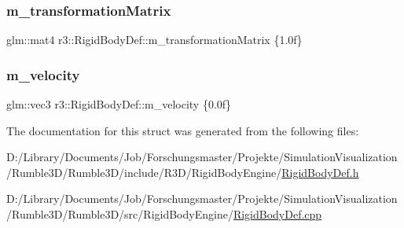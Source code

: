 \mbox{\label{structr3_1_1_rigid_body_def_a5110c4790357fbbfad4d5cc5dd89c4d6}} 
\subsubsection{\texorpdfstring{m\+\_\+transformation\+Matrix}{m\_transformationMatrix}}
{\footnotesize\ttfamily glm\+::mat4 r3\+::\+Rigid\+Body\+Def\+::m\+\_\+transformation\+Matrix \{1.\+0f\}}

\mbox{\label{structr3_1_1_rigid_body_def_a3acdc6c652745324b72165c6fc42bc39}} 
\subsubsection{\texorpdfstring{m\+\_\+velocity}{m\_velocity}}
{\footnotesize\ttfamily glm\+::vec3 r3\+::\+Rigid\+Body\+Def\+::m\+\_\+velocity \{0.\+0f\}}



The documentation for this struct was generated from the following files\+:\begin{DoxyCompactItemize}
\item 
D\+:/\+Library/\+Documents/\+Job/\+Forschungsmaster/\+Projekte/\+Simulation\+Visualization/\+Rumble3\+D/\+Rumble3\+D/include/\+R3\+D/\+Rigid\+Body\+Engine/\mbox{\hyperlink{_rigid_body_def_8h}{Rigid\+Body\+Def.\+h}}\item 
D\+:/\+Library/\+Documents/\+Job/\+Forschungsmaster/\+Projekte/\+Simulation\+Visualization/\+Rumble3\+D/\+Rumble3\+D/src/\+Rigid\+Body\+Engine/\mbox{\hyperlink{_rigid_body_def_8cpp}{Rigid\+Body\+Def.\+cpp}}\end{DoxyCompactItemize}
